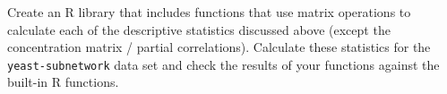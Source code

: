 \medskip
\begin{assignment}
Create an R library that includes functions that
use matrix operations to calculate each of the descriptive statistics
discussed above (except the concentration matrix / partial
correlations). Calculate these statistics for the
\lstinline!yeast-subnetwork! data set and check the results of your
functions against the built-in R functions.
\end{assignment}

